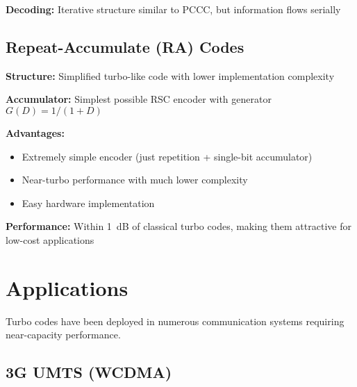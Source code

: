 \textbf{Decoding:} Iterative structure similar to PCCC, but information flows serially

\subsection{Repeat-Accumulate (RA) Codes}

\textbf{Structure:} Simplified turbo-like code with lower implementation complexity

\begin{center}
\end{center}

\textbf{Accumulator:} Simplest possible RSC encoder with generator $G(D) = 1/(1+D)$

\textbf{Advantages:}
\begin{itemize}
\item Extremely simple encoder (just repetition + single-bit accumulator)
\item Near-turbo performance with much lower complexity
\item Easy hardware implementation
\end{itemize}

\textbf{Performance:} Within 1~dB of classical turbo codes, making them attractive for low-cost applications

\section{Applications}

Turbo codes have been deployed in numerous communication systems requiring near-capacity performance.

\subsection{3G UMTS (WCDMA)}

